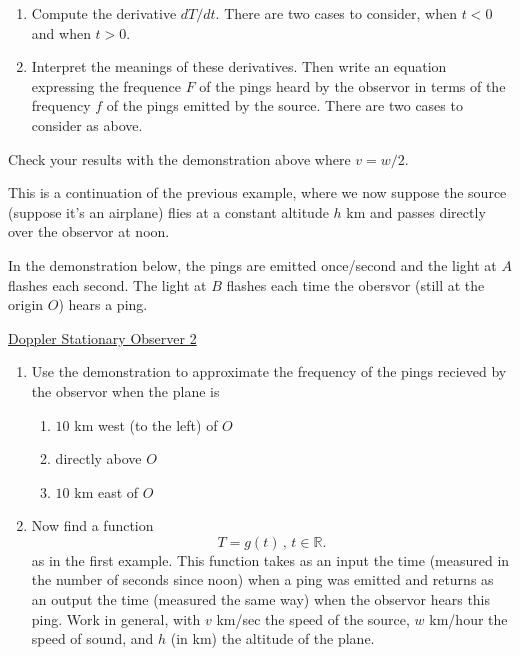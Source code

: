 \documentclass{ximera}
\begin{document}
\begin{example}
\begin{enumerate}
\item Compute the derivative $dT/dt$. There are two cases to consider, when $t<0$ and when $t>0$.

\item Interpret the meanings of these derivatives. Then write an equation expressing the frequence $F$ of the pings heard by the observor in terms of the frequency $f$ of the pings emitted by the source. There are two cases to consider as above. 
\end{enumerate}

\item Check your results with the demonstration above where $v=w/2$.

\end{example}



\begin{example} \label{ExLKDmdfRE}
This is a continuation of the previous example, where we now suppose the source (suppose it's an airplane) flies at a constant altitude $h$ km and passes directly over the observor at noon. 

In the demonstration below, the pings are emitted once/second and the light at $A$ flashes each second. The light at $B$ flashes each time the obersvor (still at the origin $O$) hears a ping.

\begin{onlineOnly}
    \begin{center}
\end{center}
\end{onlineOnly}

\href{https://www.desmos.com/calculator/ow5li8h6o6}{Doppler Stationary Observer 2}

\begin{enumerate}
\item Use the demonstration to approximate the frequency of the pings recieved by the observor when the plane is 
\begin{enumerate}
\item $10$ km west (to the left) of $O$

\item directly above $O$

\item $10$ km east of $O$
\end{enumerate} 

\item Now find a function
\[
    T = g(t) \, , \, t \in \mathbb{R}.
\]
as in the first example. This function takes as an input the time (measured in the number of seconds since noon) when a ping was emitted and returns as an output the time (measured the same way) when the observor hears this ping. Work in general, with $v$ km/sec the speed of the source, $w$ km/hour the speed of sound, and $h$ (in km) the altitude of the plane.
\end{enumerate}



\end{example}
\end{document}
